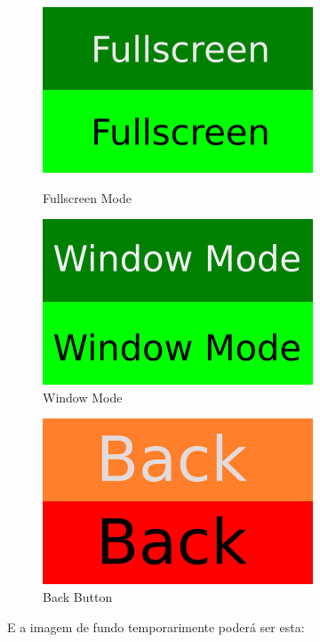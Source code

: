 \documentclass[12pt]{article}
\begin{document}
\begin{figure}[!htb]
	\centering
	\begin{minipage}{0.5\textwidth}
		\centering
		\includegraphics[scale=0.6]{menu_buttom/fullscreen_mode_button.png}
		\caption{Fullscreen Mode}
		\label{fullscreen_mode}
	\end{minipage}%
	\begin{minipage}{0.5\textwidth}
		\centering
		\includegraphics[scale=0.6]{menu_buttom/window_mode_button.png}
		\caption{Window Mode}
		\label{window_mode}
	\end{minipage}
\end{figure}

\begin{figure}[!htb]
    \centering
    \includegraphics[scale=0.6]{menu_buttom/back_button.png}
    \caption{Back Button}
    \label{fig:back_button}
\end{figure}

\newpage
E a imagem de fundo temporarimente poderá ser esta:
\end{document}
